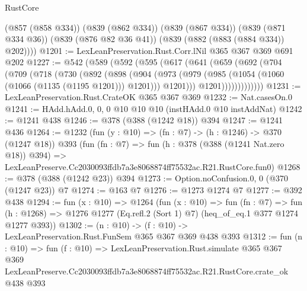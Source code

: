 \begin{lexlean}{RustCore}
\begin{coremodule}
        (@857 (@858 @334))
        (@839 (@862 @334))
        (@839 (@867 @334))
        (@839 (@871 @334 @36))
        (@839 (@876 @82 @36 @41))
        (@839 (@882 (@883 (@884 @334)) @202))))
@1201 := LexLeanPreservation.Rust.Corr.lNil @365 @367 @369 @691 @202
@1227 := @542
    (@589
      (@592
        (@595
          (@617
            (@641
              (@659
                (@692
                  (@704
                    (@709
                      (@718
                        (@730
                          (@892
                            (@898
                              (@904
                                (@973
                                  (@979
                                    (@985 (@1054 (@1060 (@1066 (@1135 (@1195 @1201))) @1201)))
                                    @1201)))
                              @1201)))))))))))))
@1231 := LexLeanPreservation.Rust.CrateOK @365 @367 @369
@1232 := Nat.casesOn.{0}
@1241 := HAdd.hAdd.{0, 0, 0} @10 @10 @10 (instHAdd.{0} @10 instAddNat)
@1242 := @1241 @438
@1246 := @378 (@388 (@1242 @18)) @394
@1247 := @1241 @436
@1264 := @1232
    (fun (y : @10) => (fn : @7) -> (h : @1246) -> @370 (@1247 @18))
    @393
    (fun (fn : @7) =>
    fun (h : @378 (@388 (@1241 Nat.zero @18)) @394) =>
    LexLeanPreserve.Cc2030093ffdb7a3e8068874ff75532ac.R21.RustCore.fun0)
@1268 := @378 (@388 (@1242 @23)) @394
@1273 := Option.noConfusion.{0, 0} (@370 (@1247 @23)) @7
@1274 := @163 @7
@1276 := @1273 @1274 @7
@1277 := @392 @438
@1294 := fun (x : @10) =>
  @1264
    (fun (x : @10) =>
    fun (fn : @7) =>
    fun (h : @1268) => @1276 @1277 (Eq.refl.{2} (Sort 1) @7) (heq_of_eq.{1} @377 @1274 @1277 @393))
@1302 := (n : @10) -> (f : @10) -> LexLeanPreservation.Rust.FunSem @365 @367 @369 @438 @393
@1312 := fun (n : @10) =>
  fun (f : @10) =>
  LexLeanPreservation.Rust.simulate
    @365
    @367
    @369
    LexLeanPreserve.Cc2030093ffdb7a3e8068874ff75532ac.R21.RustCore.crate_ok
    @438
    @393
\end{coremodule}
\end{lexlean}
